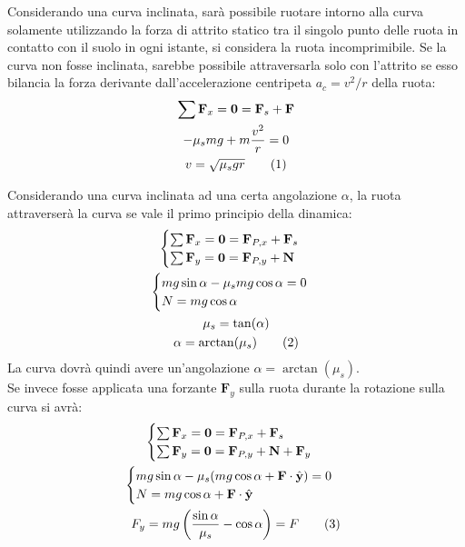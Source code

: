 \documentclass{article}
\newcommand{\vect}[1]{\boldsymbol{\mathbf{#1}}}
\numberwithin{equation}{subsection}
\begin{document}
Considerando una curva inclinata, sarà possibile ruotare intorno alla curva solamente utilizzando la forza di attrito statico tra il singolo punto delle ruota 
in contatto con il suolo in ogni istante, si considera la ruota incomprimibile. Se la curva non fosse inclinata, sarebbe possibile attraversarla 
solo con l'attrito se esso bilancia la forza derivante dall'accelerazione centripeta $a_c={v^2/}{r}$ della ruota:
\begin{gather*}
    \sum\vect{F}_x=\vect{0}=\vect{F}_s+\vect{F}\\
    -\mu_smg+m\displaystyle\frac{v^2}{r}=0\\
    v=\sqrt{\mu_sgr}\tag{\stepcounter{equation}\theequation}
\end{gather*}

Considerando una curva inclinata ad una certa angolazione $\alpha$, la ruota attraverserà la curva se vale il primo principio della dinamica:
\begin{gather*}
    \begin{cases}
        \sum\vect{F}_x=\vect{0}=\vect{F}_{P,x}+\vect{F}_s\\
        \sum\vect{F}_y=\vect{0}=\vect{F}_{P,y}+\vect{N}
    \end{cases}\\
    \begin{cases}
        mg\sin\alpha-\mu_smg\cos\alpha=0\\
        N=mg\cos\alpha
    \end{cases}\\
    \mu_s=\tan(\alpha)\\
    \alpha=\arctan(\mu_s)\tag{\stepcounter{equation}\theequation}
\end{gather*}
La curva dovrà quindi avere un'angolazione $\alpha=\arctan(\mu_s)$. \\
Se invece fosse applicata una forzante $\vect{F}_y$ sulla ruota durante la rotazione sulla curva si avrà:
\begin{gather*}
    \begin{cases}
        \sum\vect{F}_x=\vect{0}=\vect{F}_{P,x}+\vect{F}_s\\
        \sum\vect{F}_y=\vect{0}=\vect{F}_{P,y}+\vect{N}+\vect{F}_y
    \end{cases}\\
    \begin{cases}
        mg\sin\alpha-\mu_s(mg\cos\alpha+\vect{F}\cdot\hat{\vect{y}})=0\\
        N=mg\cos\alpha+\vect{F}\cdot\hat{\vect{y}}
    \end{cases}\\
    F_y=mg\left(\displaystyle\frac{\sin\alpha}{\mu_s}-\cos\alpha\right)=F\tag{\stepcounter{equation}\theequation}
\end{gather*}
\end{document}
